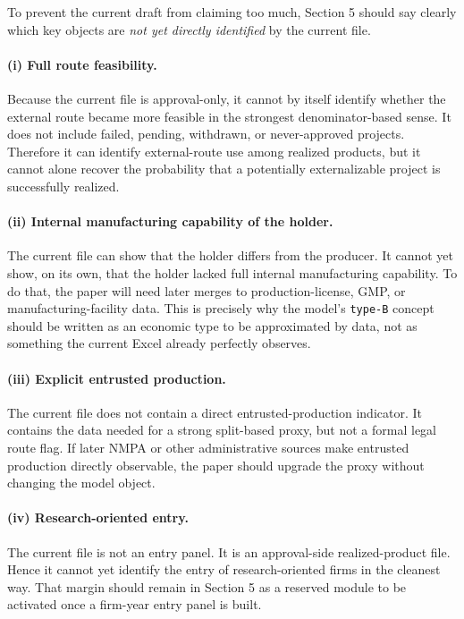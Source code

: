 \documentclass[12pt]{article}
\begin{document}
To prevent the current draft from claiming too much, Section 5 should say clearly which key
objects are \emph{not yet directly identified} by the current file.

\paragraph{(i) Full route feasibility.}
Because the current file is approval-only, it cannot by itself identify whether the external route
became more feasible in the strongest denominator-based sense. It does not include failed, pending,
withdrawn, or never-approved projects. Therefore it can identify external-route use among realized
products, but it cannot alone recover the probability that a potentially externalizable project is
successfully realized.

\paragraph{(ii) Internal manufacturing capability of the holder.}
The current file can show that the holder differs from the producer. It cannot yet show, on its
own, that the holder lacked full internal manufacturing capability. To do that, the paper will need
later merges to production-license, GMP, or manufacturing-facility data. This is precisely why the
model's \texttt{type-B} concept should be written as an economic type to be approximated by data,
not as something the current Excel already perfectly observes.

\paragraph{(iii) Explicit entrusted production.}
The current file does not contain a direct entrusted-production indicator. It contains the data
needed for a strong split-based proxy, but not a formal legal route flag. If later NMPA or other
administrative sources make entrusted production directly observable, the paper should upgrade
the proxy without changing the model object.

\paragraph{(iv) Research-oriented entry.}
The current file is not an entry panel. It is an approval-side realized-product file. Hence it cannot
yet identify the entry of research-oriented firms in the cleanest way. That margin should remain in
Section 5 as a reserved module to be activated once a firm-year entry panel is built.
\end{document}
